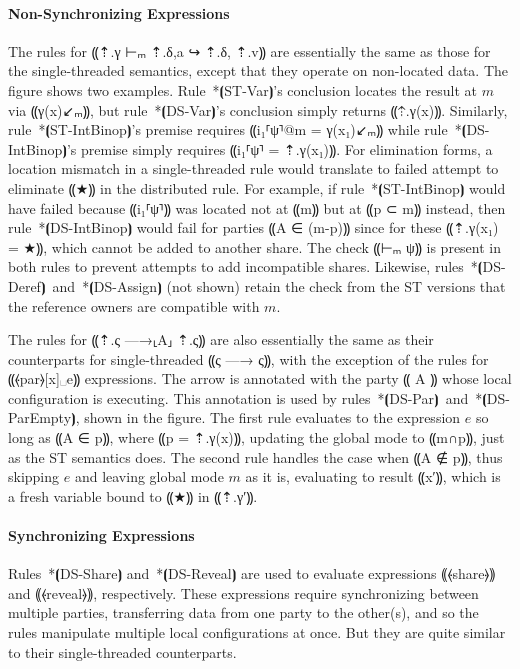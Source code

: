 \paragraph*{Non-Synchronizing Expressions} \label{para:mpc-design-dist-sem-nonsync}
%
The rules for ⸨⇡.γ ⊢ₘ ⇡.δ,a ↪ ⇡.δ, ⇡.v⸩ are essentially the same as
those for the single-threaded semantics, except that they operate on
non-located data. The figure shows two examples. Rule~*⦗ST-Var⦘'s
conclusion locates the
result at $m$ via ⸨γ(x)↙ₘ⸩, but rule~*⦗DS-Var⦘'s conclusion simply
returns ⸨⇡.γ(x)⸩. Similarly, rule~*⦗ST-IntBinop⦘'s premise requires
⸨i₁⸢ψ⸣@m = γ(x₁)↙ₘ⸩ while rule~*⦗DS-IntBinop⦘'s premise simply
requires ⸨i₁⸢ψ⸣ = ⇡.γ(x₁)⸩. For elimination forms, a location mismatch
in a single-threaded rule would translate to failed attempt to
eliminate ⸨★⸩ in the distributed rule. For example, if rule~*⦗ST-IntBinop⦘
would have failed because ⸨i₁⸢ψ⸣⸩ was located not at ⸨m⸩ but at ⸨p ⊂
m⸩ instead, then rule~*⦗DS-IntBinop⦘ would fail for parties ⸨A ∈ (m-p)⸩
since for these ⸨⇡.γ(x₁) = ★⸩, which cannot be added to another
share. The check ⸨⊢ₘ ψ⸩ is present in both rules to prevent attempts
to add incompatible shares. Likewise,
rules~*⦗DS-Deref⦘~and~*⦗DS-Assign⦘ (not shown) retain the check from the ST
versions that the reference owners are compatible with $m$.

The rules for ⸨⇡.ς —→⸤A⸥ ⇡.ς⸩ are also essentially the same as their
counterparts for single-threaded ⸨ς —→ ς⸩, with the exception of the rules for
⸨⦑par⦒[x]␣e⸩ expressions. The arrow is annotated with the party ⸨ A ⸩
whose local configuration is executing. This annotation is used by
rules~*⦗DS-Par⦘~and~*⦗DS-ParEmpty⦘, shown in the figure. The first rule evaluates to the
expression $e$ so long as ⸨A ∈ p⸩, where ⸨p = ⇡.γ(x)⸩, updating the
global mode to ⸨m∩p⸩, just as the ST semantics does. The second rule
handles the case when ⸨A ∉ p⸩, thus skipping $e$ and leaving global
mode $m$ as it is, evaluating to result ⸨x′⸩, which is a fresh
variable bound to ⸨★⸩ in ⸨⇡.γ′⸩.

\paragraph*{Synchronizing Expressions}
%
Rules~*⦗DS-Share⦘ and~*⦗DS-Reveal⦘ are used to evaluate expressions
⸨⦑share⦒⸩ and ⸨⦑reveal⦒⸩, respectively. These expressions require
synchronizing between multiple parties, transferring data from one
party to the other(s), and so the rules manipulate multiple local
configurations at once. But they are quite similar to their
single-threaded counterparts.

